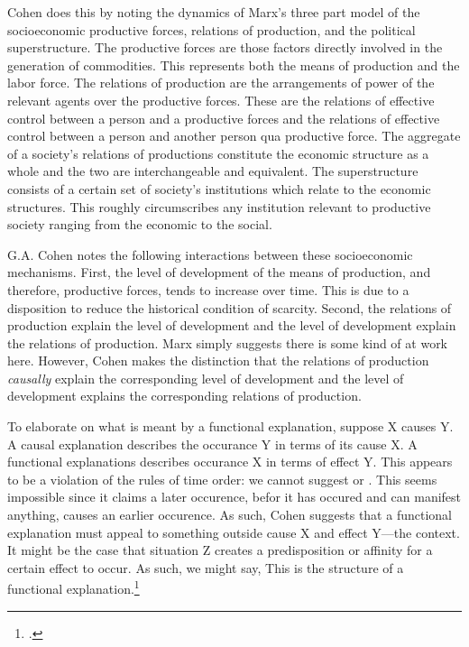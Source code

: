 \documentclass[letterpaper,notitlepage,12pt]{article}
\begin{document}
Cohen does this by noting the dynamics of Marx's three part model of the
socioeconomic productive forces, relations of production, and the political
superstructure.
The productive forces are those factors directly involved in the generation of
commodities.
This represents both the means of production and the labor force.
The relations of production are the arrangements of power of the relevant agents
over the productive forces.
These are the relations of effective control between a person and a productive
forces and the relations of effective control between a person and another
person qua productive force.
The aggregate of a society's relations of productions constitute the economic
structure as a whole and the two are interchangeable and equivalent.
The superstructure consists of a certain set of society's institutions which
relate to the economic structures.
This roughly circumscribes any institution relevant to productive society
ranging from the economic to the social.

G.A. Cohen notes the following interactions between these socioeconomic
mechanisms.
First, the level of development of the means of production, and therefore,
productive forces, tends to increase over time.
This is due to a disposition to reduce the historical condition of scarcity.
Second, the relations of production explain the level of development and the
level of development explain the relations of production.
Marx simply suggests there is some kind of  at work
here.
However, Cohen makes the distinction that the relations of production
\textit{causally} explain the corresponding level of development and the level
of development  explains the corresponding relations of
production.

To elaborate on what is meant by a functional explanation, suppose X causes Y.
A causal explanation describes the occurance Y in terms of its cause X.
A functional explanations describes occurance X in terms of effect Y.
This appears to be a violation of the rules of time order: we cannot suggest
 or . 
This seems impossible since it claims a later occurence, befor it has occured
and can manifest anything, causes an earlier occurence.
As such, Cohen suggests that a functional explanation must appeal to something
outside cause X and effect Y---the context.
It might be the case that situation Z creates a predisposition or affinity for a
certain effect to occur.
As such, we might say, 
This is the structure of a functional explanation.\footcite{cohen_karl_2001}
\end{document}
